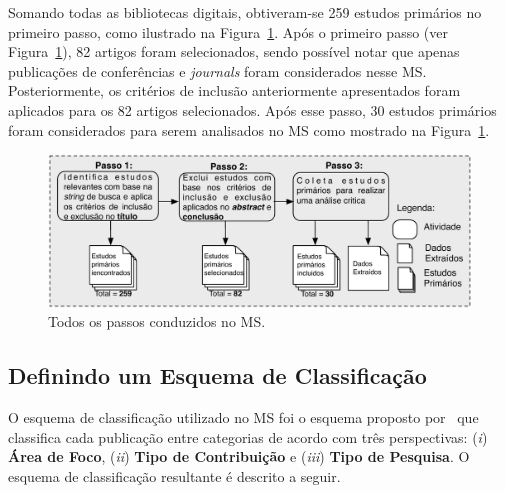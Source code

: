 Somando todas as bibliotecas digitais, obtiveram-se 259 estudos primários no primeiro passo, como ilustrado na Figura~\ref{fig:todos_os_passos}. Após o primeiro passo (ver Figura~\ref{fig:todos_os_passos}), 82 artigos foram selecionados, sendo possível notar que apenas publicações de conferências e \textit{journals} foram considerados nesse MS. Posteriormente, os critérios de inclusão anteriormente apresentados foram aplicados para os 82 artigos selecionados. Após esse passo, 30 estudos primários foram considerados para serem analisados no MS como mostrado na Figura~\ref{fig:todos_os_passos}.

\begin{figure}[h]
 \caption{Todos os passos conduzidos no MS.}
 \label{fig:todos_os_passos}
 \centering
 \includegraphics[scale=0.7]{images/todosOsPassosMS}
 \fautor
\end{figure}

\subsection{Definindo um Esquema de Classificação}\label{subsec:definindo_esquema_de_classificacao}

O esquema de classificação utilizado no MS foi o esquema proposto por~ que classifica cada publicação entre categorias de acordo com três perspectivas: (\textit{i}) \textbf{Área de Foco}, (\textit{ii}) \textbf{Tipo de Contribuição} e (\textit{iii}) \textbf{Tipo de Pesquisa}. O esquema de classificação resultante é descrito a seguir.

